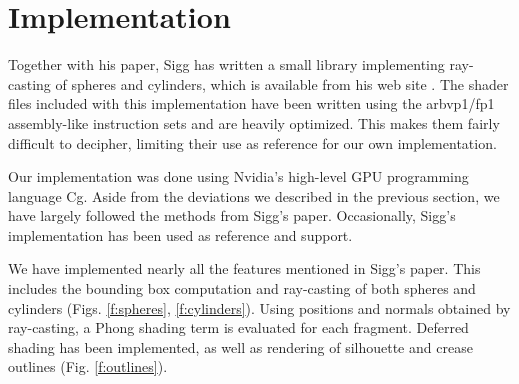 \section{Implementation}

Together with his paper, Sigg has written a small library implementing ray-casting of spheres and cylinders, 
which is available from his web site \cite{siggsite}.
The shader files included with this implementation have been written using the arbvp1/fp1 assembly-like instruction sets and are heavily optimized.
This makes them fairly difficult to decipher, limiting their use as reference for our own implementation.

Our implementation was done using Nvidia's high-level GPU programming language Cg.
Aside from the deviations we described in the previous section, we have largely followed the methods from Sigg's paper.
Occasionally, Sigg's implementation has been used as reference and support.

We have implemented nearly all the features mentioned in Sigg's paper.
This includes the bounding box computation and ray-casting of both spheres and cylinders (Figs. \ref{f:spheres}, \ref{f:cylinders}).
Using positions and normals obtained by ray-casting, a Phong shading term is evaluated for each fragment.
Deferred shading has been implemented, as well as rendering of silhouette and crease outlines (Fig. \ref{f:outlines}).

